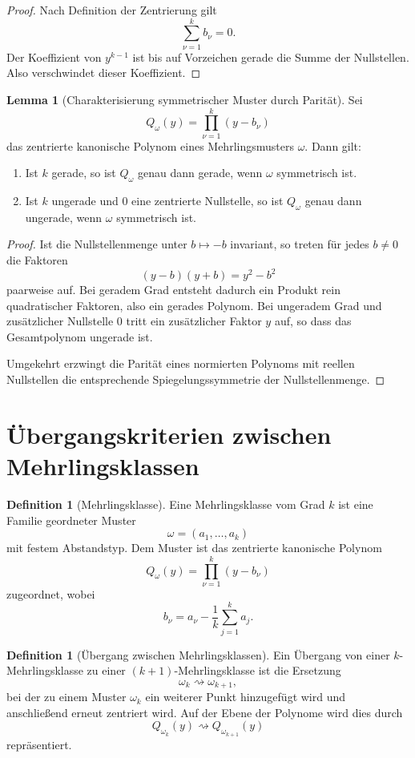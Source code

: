 \documentclass[11pt,a4paper]{article}
\theoremstyle{definition}
\newtheorem{lemma}[satz]{Lemma}
\newtheorem{definition}[satz]{Definition}
\begin{document}
\begin{proof}
Nach Definition der Zentrierung gilt
\[
\sum_{\nu=1}^k b_\nu=0.
\]
Der Koeffizient von \(y^{k-1}\) ist bis auf Vorzeichen gerade die Summe der Nullstellen. Also verschwindet dieser Koeffizient.
\end{proof}

\begin{lemma}[Charakterisierung symmetrischer Muster durch Parität]
Sei
\[
Q_\omega(y)=\prod_{\nu=1}^k (y-b_\nu)
\]
das zentrierte kanonische Polynom eines Mehrlingsmusters \(\omega\).
Dann gilt:
\begin{enumerate}[leftmargin=2em]
\item Ist \(k\) gerade, so ist \(Q_\omega\) genau dann gerade, wenn \(\omega\) symmetrisch ist.
\item Ist \(k\) ungerade und \(0\) eine zentrierte Nullstelle, so ist \(Q_\omega\) genau dann ungerade, wenn \(\omega\) symmetrisch ist.
\end{enumerate}
\end{lemma}

\begin{proof}
Ist die Nullstellenmenge unter \(b\mapsto -b\) invariant, so treten für jedes \(b\neq 0\) die Faktoren
\[
(y-b)(y+b)=y^2-b^2
\]
paarweise auf. Bei geradem Grad entsteht dadurch ein Produkt rein quadratischer Faktoren, also ein gerades Polynom. Bei ungeradem Grad und zusätzlicher Nullstelle \(0\) tritt ein zusätzlicher Faktor \(y\) auf, so dass das Gesamtpolynom ungerade ist.

Umgekehrt erzwingt die Parität eines normierten Polynoms mit reellen Nullstellen die entsprechende Spiegelungssymmetrie der Nullstellenmenge.
\end{proof}

\section{Übergangskriterien zwischen Mehrlingsklassen}

\begin{definition}[Mehrlingsklasse]
Eine Mehrlingsklasse vom Grad \(k\) ist eine Familie geordneter Muster
\[
\omega=(a_1,\dots,a_k)
\]
mit festem Abstandstyp. Dem Muster ist das zentrierte kanonische Polynom
\[
Q_\omega(y)=\prod_{\nu=1}^k (y-b_\nu)
\]
zugeordnet, wobei
\[
b_\nu=a_\nu-\frac{1}{k}\sum_{j=1}^k a_j.
\]
\end{definition}

\begin{definition}[Übergang zwischen Mehrlingsklassen]
Ein Übergang von einer \(k\)-Mehrlingsklasse zu einer \((k+1)\)-Mehrlingsklasse ist die Ersetzung
\[
\omega_k \rightsquigarrow \omega_{k+1},
\]
bei der zu einem Muster \(\omega_k\) ein weiterer Punkt hinzugefügt wird und anschließend erneut zentriert wird. Auf der Ebene der Polynome wird dies durch
\[
Q_{\omega_k}(y)\rightsquigarrow Q_{\omega_{k+1}}(y)
\]
repräsentiert.
\end{definition}
\end{document}
